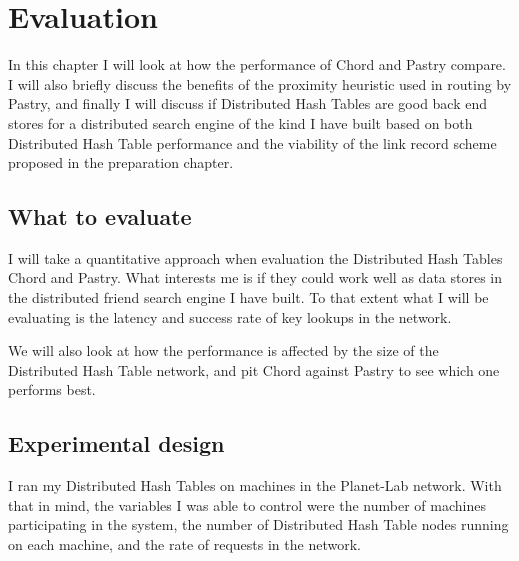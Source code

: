 

%
%
%
% 
%

\chapter{Evaluation}
In this chapter I will look at how the performance of Chord and Pastry compare. I will also briefly discuss the benefits of the proximity heuristic used in routing by Pastry, and finally I will discuss if Distributed Hash Tables are good back end stores for a distributed search engine of the kind I have built based on both Distributed Hash Table performance and the viability of the link record scheme proposed in the preparation chapter.

\section{What to evaluate}
I will take a quantitative approach when evaluation the Distributed Hash Tables Chord and Pastry. What interests me is if they could work well as data stores in the distributed friend search engine I have built. To that extent what I will be evaluating is the latency and success rate of key lookups in the network.

We will also look at how the performance is affected by the size of the Distributed Hash Table network, and pit Chord against Pastry to see which one performs best.

\section{Experimental design}
I ran my Distributed Hash Tables on machines in the Planet-Lab network. With that in mind, the variables I was able to control were the number of machines participating in the system, the number of Distributed Hash Table nodes running on each machine, and the rate of requests in the network.

